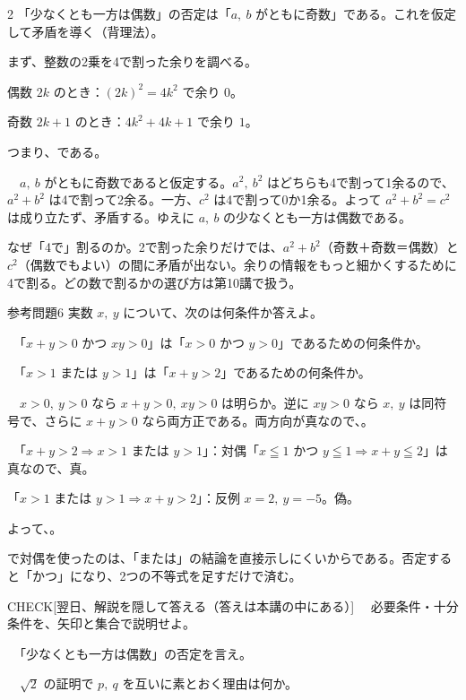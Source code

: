 \documentclass[paper=b5j, fontsize=8pt, fleqn, twoside]{jlreq}
\begin{document}
\begin{multicols*}{2}
  「少なくとも一方は偶数」の否定は「$a,\ b$ がともに奇数」である。これを仮定して矛盾を導く（背理法）。\par
  まず、整数の2乗を4で割った余りを調べる。\par
  偶数 $2k$ のとき：$(2k)^2=4k^2$ で余り $0$。\par
  奇数 $2k+1$ のとき：$4k^2+4k+1$ で余り $1$。\par
  つまり、である。

  　$a,\ b$ がともに奇数であると仮定する。$a^2,\ b^2$ はどちらも4で割って1余るので、$a^2+b^2$ は4で割って2余る。一方、$c^2$ は4で割って0か1余る。よって $a^2+b^2=c^2$ は成り立たず、矛盾する。ゆえに $a,\ b$ の少なくとも一方は偶数である。\QED

  \begin{memo}
    なぜ「4で」割るのか。2で割った余りだけでは、$a^2+b^2$（奇数＋奇数＝偶数）と $c^2$（偶数でもよい）の間に矛盾が出ない。余りの情報をもっと細かくするために4で割る。どの数で割るかの選び方は第10講で扱う。
  \end{memo}

  \begin{simple}[出典：オリジナル]{参考問題6}
    実数 $x,\ y$ について、次のは何条件か答えよ。\par
    　「$x+y>0$ かつ $xy>0$」は「$x>0$ かつ $y>0$」であるための何条件か。\par
    　「$x>1$ または $y>1$」は「$x+y>2$」であるための何条件か。
  \end{simple}
  \Kai
  　$x>0,\ y>0$ なら $x+y>0,\ xy>0$ は明らか。逆に $xy>0$ なら $x,\ y$ は同符号で、さらに $x+y>0$ なら両方正である。両方向が真なので、。\par
  　「$x+y>2\Rightarrow x>1$ または $y>1$」：対偶「$x\leqq1$ かつ $y\leqq1\Rightarrow x+y\leqq2$」は真なので、真。\par
  「$x>1$ または $y>1\Rightarrow x+y>2$」：反例 $x=2,\ y=-5$。偽。\par
  よって、。

  \begin{memo}
    で対偶を使ったのは、「または」の結論を直接示しにくいからである。否定すると「かつ」になり、2つの不等式を足すだけで済む。
  \end{memo}

  \begin{ptbs}{CHECK}[翌日、解説を隠して答える（答えは本講の中にある）]
    　必要条件・十分条件を、矢印と集合で説明せよ。\par
    　「少なくとも一方は偶数」の否定を言え。\par
    　$\sqrt2$ の証明で $p,\ q$ を互いに素とおく理由は何か。
  \end{ptbs}

  \notefill
\end{multicols*}
\end{document}

